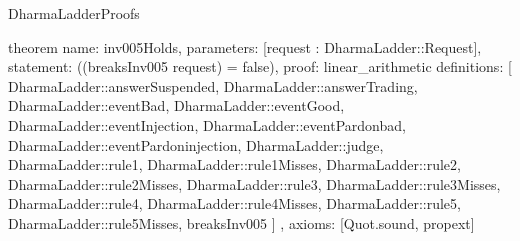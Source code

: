\begin{lexlean}{DharmaLadderProofs}
\begin{semanticmodule}
theorem{
  name: inv005Holds,
  parameters: [request : DharmaLadder::Request],
  statement: ((breaksInv005 request) = false),
  proof: linear_arithmetic{
    definitions: [
      DharmaLadder::answerSuspended,
      DharmaLadder::answerTrading,
      DharmaLadder::eventBad,
      DharmaLadder::eventGood,
      DharmaLadder::eventInjection,
      DharmaLadder::eventPardonbad,
      DharmaLadder::eventPardoninjection,
      DharmaLadder::judge,
      DharmaLadder::rule1,
      DharmaLadder::rule1Misses,
      DharmaLadder::rule2,
      DharmaLadder::rule2Misses,
      DharmaLadder::rule3,
      DharmaLadder::rule3Misses,
      DharmaLadder::rule4,
      DharmaLadder::rule4Misses,
      DharmaLadder::rule5,
      DharmaLadder::rule5Misses,
      breaksInv005
    ]
  },
  axioms: [Quot.sound, propext]
}
\end{semanticmodule}
\end{lexlean}
